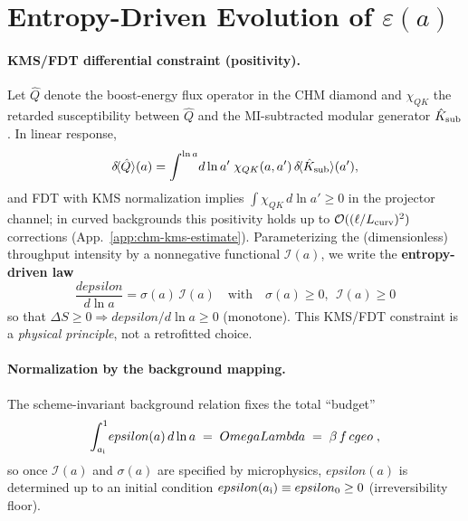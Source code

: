 \documentclass[aps,prd,onecolumn,superscriptaddress,nofootinbib]{revtex4-2}
\def\OmL{OmegaLambda}%
\def\cgeo{cgeo}%
\def\eps{epsilon}%
\def\boxed#1{#1}%
\def\Omega_\Lambda{OmegaLambda}%
\providecommand{\OmL}{\Omega_\Lambda}
\providecommand{\cgeo}{c_{\rm geo}}
\providecommand{\eps}{\varepsilon}
\begin{document}
\section{Entropy-Driven Evolution of \texorpdfstring{$\varepsilon(a)$}{epsilon(a)}}
\label{sec:epsilon}
\paragraph{KMS/FDT differential constraint (positivity).}
Let \(\hat Q\) denote the boost-energy flux operator in the CHM diamond and \(\chi_{QK}\) the retarded susceptibility between \(\hat Q\) and the MI-subtracted modular generator \(\hat K_{\rm sub}\). In linear response,
\[
\delta\!\langle \hat Q\rangle(a) = \int^{\ln a}\! d\ln a' \; \chi_{QK}(a,a')\, \delta\!\langle \hat K_{\rm sub}\rangle(a'),
\]
and FDT with KMS normalization implies \(\int \chi_{QK}\,d\ln a'\ge 0\) in the projector channel; in curved backgrounds this positivity holds up to \(\mathcal O((\ell/L_{\rm curv})^2)\) corrections (App.~\ref{app:chm-kms-estimate}).
Parameterizing the (dimensionless) throughput intensity by a nonnegative functional \(\mathcal I(a)\), we write the \textbf{entropy-driven law}
\begin{equation}
\label{eq:eps-ode}
\boxed{\;\frac{d\eps}{d\ln a} = \sigma(a)\,\mathcal I(a)\quad\text{with}\quad \sigma(a)\ge 0,\ \ \mathcal I(a)\ge 0\;}
\end{equation}
so that \(\Delta S\ge 0\Rightarrow d\eps/d\ln a\ge 0\) (monotone). This KMS/FDT constraint is a \emph{physical principle}, not a retrofitted choice.

\paragraph{Normalization by the background mapping.}
The scheme-invariant background relation fixes the total ``budget''
\begin{equation}
\label{eq:budget}
\boxed{\;\int_{a_{\rm i}}^{1}\!\eps(a)\, d\ln a \;=\; \OmL \;=\; \beta\, f\,\cgeo\; ,\;}
\end{equation}
so once \(\mathcal I(a)\) and \(\sigma(a)\) are specified by microphysics, \(\eps(a)\) is determined up to an initial condition \(\eps(a_{\rm i})\equiv \eps_0\ge 0\) (irreversibility floor).
\end{document}
